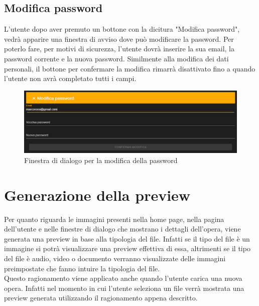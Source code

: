\subsection{Modifica password}
L'utente dopo aver premuto un bottone con la dicitura "Modifica password", vedrà apparire una finestra di avviso dove può modificare la password. Per poterlo fare, per motivi di sicurezza, l'utente dovrà inserire la sua email, la password corrente e la nuova password. Similmente alla modifica dei dati personali, il bottone per confermare la modifica rimarrà disattivato fino a quando l'utente non avrà completato tutti i campi.
\begin{figure}[H]
	\begin{center}
		\includegraphics[width=0.6\columnwidth]{immagini/modificaPassword.png}
		\caption{Finestra di dialogo per la modifica della password}
	\end{center}
\end{figure}

\section{Generazione della preview}

Per quanto riguarda le immagini presenti nella home page, nella pagina dell'utente e nelle finestre di dialogo che mostrano i dettagli dell'opera, viene generata una preview in base alla tipologia del file. Infatti se il tipo del file è un immagine si potrà visualizzare una preview effettiva di essa, altrimenti se il tipo del file è audio, video o documento verranno visualizzate delle immagini preimpostate che fanno intuire la tipologia del file.\\
Questo ragionamento viene applicato anche quando l'utente carica una nuova opera. Infatti nel momento in cui l'utente seleziona un file verrà mostrata una preview generata utilizzando il ragionamento appena descritto.